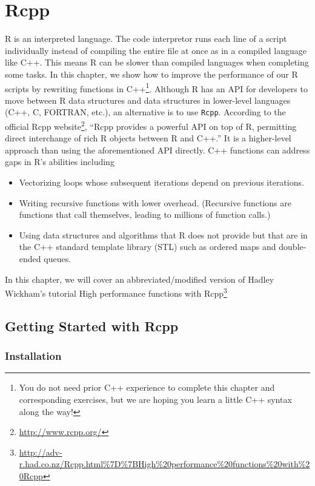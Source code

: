 \documentclass[]{krantz}
\providecommand{\tightlist}{%
  \setlength{\itemsep}{0pt}\setlength{\parskip}{0pt}}
\renewcommand{\href}[2]{#2\footnote{\url{#1}}}
\begin{document}
\hypertarget{rcpp}{%
\chapter{Rcpp}\label{rcpp}}

R is an interpreted language. The code interpretor runs each line of a script individually instead of compiling the entire file at once as in a compiled language like C++. This means R can be slower than compiled languages when completing some tasks. In this chapter, we show how to improve the performance of our R scripts by rewriting functions in C++\footnote{You do not need prior C++ experience to complete this chapter and corresponding exercises, but we are hoping you learn a little C++ syntax along the way!}. Although R has an API for developers to move between R data structures and data structures in lower-level languages (C++, C, FORTRAN, etc.), an alternative is to use \texttt{Rcpp}. According to the \href{http://www.rcpp.org/}{official Rcpp website}, ``Rcpp provides a powerful API on top of R, permitting direct interchange of rich R objects between R and C++.'' It is a higher-level approach than using the aforementioned API directly. C++ functions can address gaps in R's abilities including

\begin{itemize}
\tightlist
\item
  Vectorizing loops whose subsequent iterations depend on previous iterations.
\item
  Writing recursive functions with lower overhead. (Recursive functions are functions that call themselves, leading to millions of function calls.)
\item
  Using data structures and algorithms that R does not provide but that are in the C++ standard template library (STL) such as ordered maps and double-ended queues.
\end{itemize}

In this chapter, we will cover an abbreviated/modified version of Hadley Wickham's tutorial \href{http://adv-r.had.co.nz/Rcpp.html\%7D\%7BHigh\%20performance\%20functions\%20with\%20Rcpp}{High performance functions with Rcpp}

\hypertarget{getting-started-with-rcpp}{%
\section{Getting Started with Rcpp}\label{getting-started-with-rcpp}}

\hypertarget{installation}{%
\subsection{Installation}\label{installation}}
\end{document}
